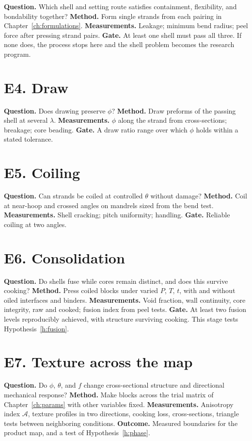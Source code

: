\documentclass[11pt,openany]{book}
\theoremstyle{definition}
\begin{document}
\textbf{Question.} Which shell and setting route satisfies containment, flexibility, and bondability together? \textbf{Method.} Form single strands from each pairing in Chapter~\ref{ch:formulations}. \textbf{Measurements.} Leakage; minimum bend radius; peel force after pressing strand pairs. \textbf{Gate.} At least one shell must pass all three. If none does, the process stops here and the shell problem becomes the research program.

\section*{E4. Draw}

\textbf{Question.} Does drawing preserve $\phi$? \textbf{Method.} Draw preforms of the passing shell at several $\lambda$. \textbf{Measurements.} $\phi$ along the strand from cross-sections; breakage; core beading. \textbf{Gate.} A draw ratio range over which $\phi$ holds within a stated tolerance.

\section*{E5. Coiling}

\textbf{Question.} Can strands be coiled at controlled $\theta$ without damage? \textbf{Method.} Coil at near-hoop and crossed angles on mandrels sized from the bend test. \textbf{Measurements.} Shell cracking; pitch uniformity; handling. \textbf{Gate.} Reliable coiling at two angles.

\section*{E6. Consolidation}

\textbf{Question.} Do shells fuse while cores remain distinct, and does this survive cooking? \textbf{Method.} Press coiled blocks under varied $P$, $T$, $t$, with and without oiled interfaces and binders. \textbf{Measurements.} Void fraction, wall continuity, core integrity, raw and cooked; fusion index from peel tests. \textbf{Gate.} At least two fusion levels reproducibly achieved, with structure surviving cooking. This stage tests Hypothesis~\ref{h:fusion}.

\section*{E7. Texture across the map}

\textbf{Question.} Do $\phi$, $\theta$, and $f$ change cross-sectional structure and directional mechanical response? \textbf{Method.} Make blocks across the trial matrix of Chapter~\ref{ch:params} with other variables fixed. \textbf{Measurements.} Anisotropy index $\mathcal{A}$, texture profiles in two directions, cooking loss, cross-sections, triangle tests between neighboring conditions. \textbf{Outcome.} Measured boundaries for the product map, and a test of Hypothesis~\ref{h:phase}.
\end{document}
